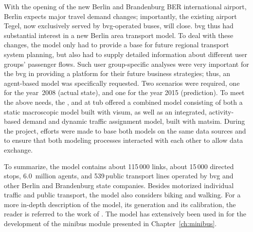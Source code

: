 With the opening of the new Berlin and Brandenburg BER international airport,
Berlin expects major travel demand changes; importantly, the
existing airport Tegel, now exclusively served by \gls{bvg}-operated buses, 
will close. \gls{bvg} thus had substantial interest in a new Berlin area transport model. 
To deal with these changes, the model only had to provide
a base for future regional transport system planning, but also had to supply
detailed information about different user groups' passenger flows. 
Such user group-specific analyses were very important for
the \gls{bvg} in providing a platform for their future business strategies; thus,
an agent-based model was specifically requested. Two scenarios were
required, one for the year~2008 (actual state), and one for the year
2015 (prediction). To meet the above needs, the
\citet{PTV2013}, \citet{Senozon2013} and \citet{VSP2013} at \gls{tub}
offered a combined model consisting of both a static macroscopic model built with
\gls{visum}, as well as an integrated, activity-based demand and
dynamic traffic assignment model, built with \gls{matsim}. During
the project, efforts were made to base both models on the same data
sources and to ensure that both modeling processes interacted with each other to allow data
exchange.

To summarize, the model contains about 115\,000 links, %
about 15\,000 directed stops, %
6.0~million agents, %
and 539\,public transport lines operated by \gls{bvg} and other Berlin and Brandenburg state companies. 
Besides motorized individual traffic and public transport, the model also considers biking and walking. 
For a more in-depth description of the model, its generation and its calibration, the reader is referred to the work of
\cite{NeumannEtAl2014IatbrPtBerlinBook}. The model has extensively been used in \citet[][Ch.~7/8]{Neumann2014PhD} for the development of the minibus module presented in Chapter~\ref{ch:minibus}.

